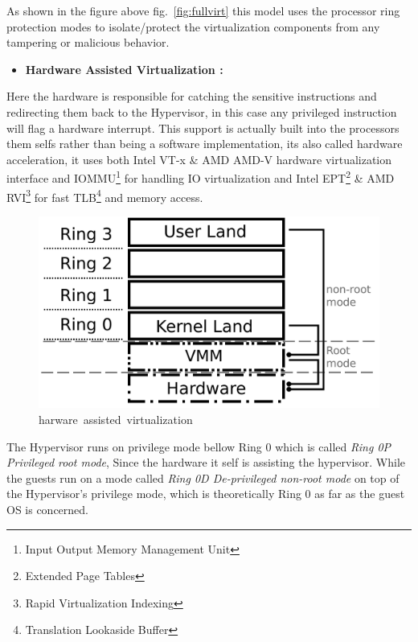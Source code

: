 \documentclass[
  14pt,
  english,
  a4paper,
]{scrreprt}
\providecommand{\tightlist}{%
  \setlength{\itemsep}{0pt}\setlength{\parskip}{0pt}}
\begin{document}
As shown in the figure above fig.~\ref{fig:fullvirt} this model uses the
processor ring protection modes to isolate/protect the virtualization
components from any tampering or malicious behavior.

\begin{itemize}
\tightlist
\item
  \textbf{Hardware Assisted Virtualization :}
\end{itemize}

Here the hardware is responsible for catching the sensitive instructions
and redirecting them back to the Hypervisor, in this case any privileged
instruction will flag a hardware interrupt. This support is actually
built into the processors them selfs rather than being a software
implementation, its also called hardware acceleration, it uses both
Intel VT-x \& AMD AMD-V hardware virtualization interface and
IOMMU\footnote{Input Output Memory Management Unit} for handling IO
virtualization and Intel EPT\footnote{Extended Page Tables} \& AMD
RVI\footnote{Rapid Virtualization Indexing} for fast TLB\footnote{Translation
  Lookaside Buffer} and memory access.

\begin{figure}
\hypertarget{fig:hardvirt}{%
\centering
\includegraphics[width=1\textwidth,height=\textheight]{figures/hardwarevirtualization_diagram.png}
\caption{harware~assisted~virtualization}\label{fig:hardvirt}
}
\end{figure}

The Hypervisor runs on privilege mode bellow Ring 0 which is called
\emph{Ring 0P Privileged root mode}, Since the hardware it self is
assisting the hypervisor. While the guests run on a mode called
\emph{Ring 0D De-privileged non-root mode} on top of the Hypervisor's
privilege mode, which is theoretically Ring 0 as far as the guest OS is
concerned.
\end{document}
